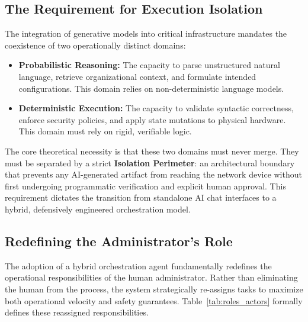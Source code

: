 \subsection{The Requirement for Execution Isolation}
The integration of generative models into critical infrastructure mandates the coexistence of two operationally distinct domains:

\begin{itemize}
    \item \textbf{Probabilistic Reasoning:} The capacity to parse unstructured natural language, retrieve organizational context, and formulate intended configurations. This domain relies on non-deterministic language models.
    \item \textbf{Deterministic Execution:} The capacity to validate syntactic correctness, enforce security policies, and apply state mutations to physical hardware. This domain must rely on rigid, verifiable logic.
\end{itemize}

The core theoretical necessity is that these two domains must never merge. They must be separated by a strict \textbf{Isolation Perimeter}: an architectural boundary that prevents any AI-generated artifact from reaching the network device without first undergoing programmatic verification and explicit human approval. This requirement dictates the transition from standalone AI chat interfaces to a hybrid, defensively engineered orchestration model.

\subsection{Redefining the Administrator's Role}
The adoption of a hybrid orchestration agent fundamentally redefines the operational responsibilities of the human administrator. Rather than eliminating the human from the process, the system strategically re-assigns tasks to maximize both operational velocity and safety guarantees. Table~\ref{tab:roles_actors} formally defines these reassigned responsibilities.

